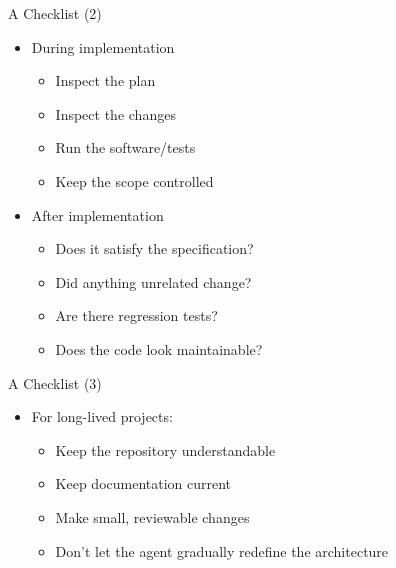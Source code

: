 \documentclass[
ps,
]{prosper}
\begin{document}
\begin{slide}{A Checklist (2)}

\begin{itemize}

\item During implementation

  \begin{itemize}
 
  \item Inspect the plan

  \item Inspect the changes

  \item Run the software/tests

  \item Keep the scope controlled
    
  \end{itemize}
  
\item After implementation

  \begin{itemize}
 
  \item Does it satisfy the specification?

  \item Did anything unrelated change?

  \item Are there regression tests?

  \item Does the code look maintainable?
    
  \end{itemize}

\end{itemize}
  
\end{slide}


\begin{slide}{A Checklist (3)}

\begin{itemize}
 
\item For long-lived projects:

  \begin{itemize}
    
  \item Keep the repository understandable

  \item Keep documentation current

  \item Make small, reviewable changes

  \item Don't let the agent gradually redefine the architecture
    
  \end{itemize}
  
\end{itemize}
  
\end{slide}
\end{document}
